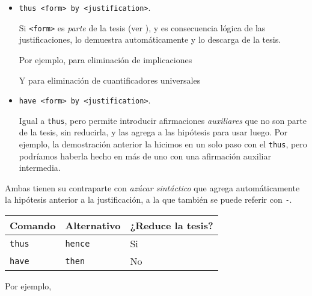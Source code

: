 \begin{itemize}
    \item \texttt{thus <form>\ by <justification>}.
    
    Si \texttt{<form>} es \textit{parte} de la tesis (ver
    ), y es consecuencia lógica de las
    justificaciones, lo demuestra automáticamente y lo descarga de la tesis.

    Por ejemplo, para eliminación de implicaciones

    

    Y para eliminación de cuantificadores universales

    

    \item \texttt{have <form>\ by <justification>}.
    
    Igual a \lstinline{thus}, pero permite introducir afirmaciones
    \textit{auxiliares} que no son parte de la tesis, sin reducirla, y las
    agrega a las hipótesis para usar luego. Por ejemplo, la demostración
    anterior la hicimos en un solo paso con el \lstinline{thus}, pero podríamos
    haberla hecho en más de uno con una afirmación auxiliar intermedia.

    
\end{itemize}

Ambas tienen su contraparte con \textit{azúcar sintáctico} que agrega
automáticamente la hipótesis anterior a la justificación, a la que también se
puede referir con \texttt{-}.

\begin{table}[H]
    \centering
\begin{tabular}{l|l|l}
Comando             & Alternativo             & ¿Reduce la tesis? \\
\hline
\lstinline|thus|    & \lstinline|hence|       & Si               \\
\lstinline|have|    & \lstinline|then|        & No              
\end{tabular}
\end{table}

Por ejemplo, 
\begin{multicols}{2}
    
    \vfill\null
    \columnbreak
    
\end{multicols}


